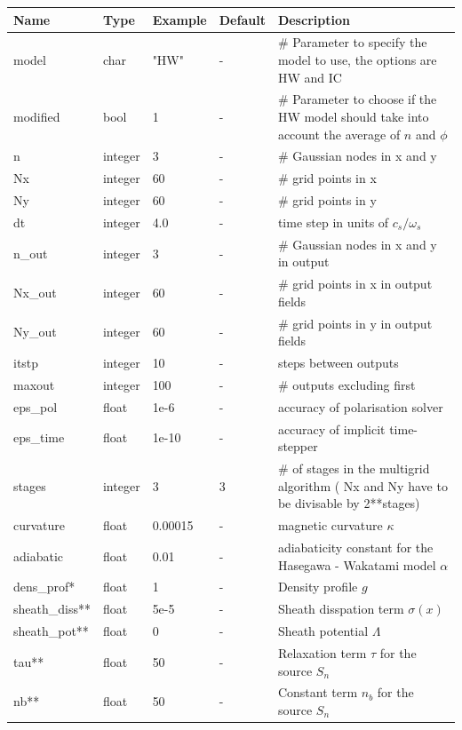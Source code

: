 \documentclass{hitec} %
\begin{document}
\begin{longtable}{llll>{\RaggedRight}p{7cm}}
\toprule
\rowcolor{gray!50}\textbf{Name} &  \textbf{Type} & \textbf{Example} & \textbf{Default} & \textbf{Description}  \\ \midrule
model  & char  & "HW" & - & \# Parameter to specify the model to use, the options are HW and IC \\
modified & bool & 1 & - & \# Parameter to choose if the HW model should take into account the average of $n$ and $\phi$ \\
n      & integer & 3 & - &\# Gaussian nodes in x and y \\
Nx     & integer & 60 & - &\# grid points in x \\
Ny     & integer & 60 & - &\# grid points in y \\
dt     & integer & 4.0 & - &time step in units of $c_s/\omega_s$ \\
n\_out  & integer & 3  & - &\# Gaussian nodes in x and y in output \\
Nx\_out & integer & 60 & - &\# grid points in x in output fields \\
Ny\_out & integer & 60 & - &\# grid points in y in output fields \\
itstp  & integer & 10  & - &   steps between outputs \\
maxout & integer & 100& - &      \# outputs excluding first \\
eps\_pol   & float & 1e-6    & - &  accuracy of polarisation solver \\
eps\_time  & float & 1e-10   & - & accuracy of implicit time-stepper \\
stages & integer & 3 & 3 & \# of stages in the  multigrid algorithm ( Nx and Ny have to be divisable by 2**stages) \\
curvature  & float & 0.00015 & - & magnetic curvature $\kappa$ \\
adiabatic  & float & 0.01 & - & adiabaticity constant for the Hasegawa - Wakatami model $\alpha$\\
dens\_prof*   & float & 1     & - & Density profile $g$ \\
sheath\_diss** & float & 5e-5  & - & Sheath disspation term $\sigma(x)$ \\
sheath\_pot**  & float & 0     & - & Sheath potential $\Lambda$ \\
tau**          & float & 50    & - & Relaxation term $\tau$ for the source $S_n$ \\
nb**          & float & 50    & - & Constant term $n_b$ for the source $S_n$ \\

\end{longtable}
\end{document}
